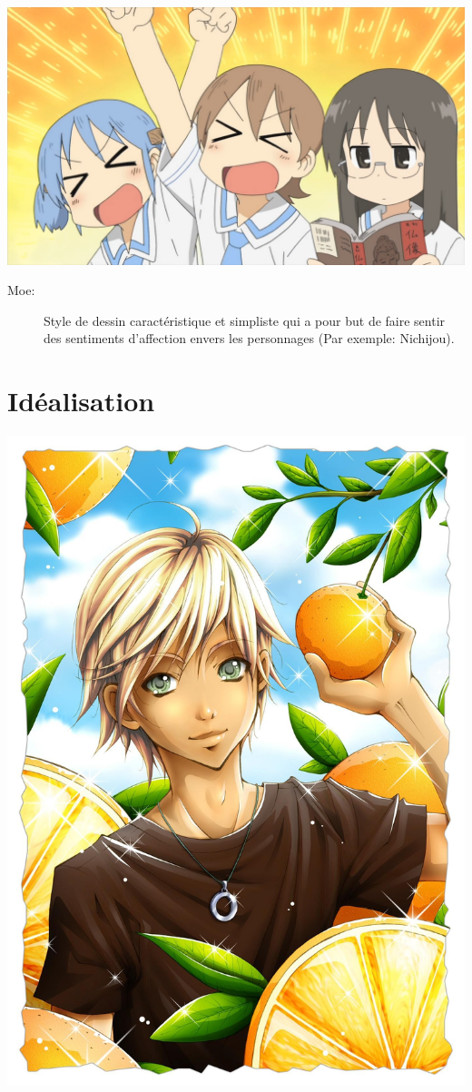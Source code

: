 \begin{center}
	\includegraphics[scale=0.3]{Moe.png}
\end{center}

\begin{description}
	\item[Moe:] Style de dessin caractéristique et simpliste qui a pour but de
		faire sentir des sentiments d'affection envers les personnages (Par
		exemple: Nichijou).
\end{description}

\section{Idéalisation}

\begin{center}
	\includegraphics[scale=0.15]{Bishounen.jpeg}
\end{center}

